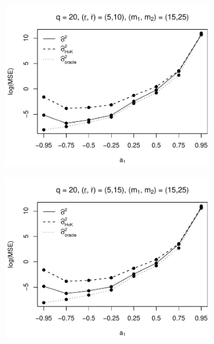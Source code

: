 \begin{figure}[p]
\begin{subfigure}[b]{0.45\textwidth}
\includegraphics[width=\textwidth]{Plots/Plots_Supplement/MSE_lrv_T=500_slope=10_(L1,L2,K1,K2,M1,M2)=(20,20,5,10,15,25).pdf}
\end{subfigure}
\hspace{0.25cm}
\begin{subfigure}[b]{0.45\textwidth}
\includegraphics[width=\textwidth]{Plots/Plots_Supplement/MSE_lrv_T=500_slope=10_(L1,L2,K1,K2,M1,M2)=(20,20,5,15,15,25).pdf}
\end{subfigure}


\end{figure}
